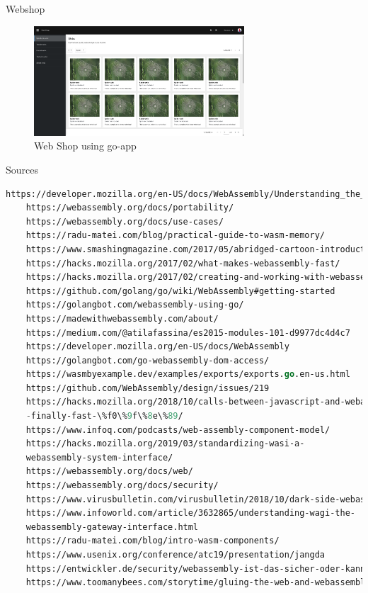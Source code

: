 \documentclass{beamer}
\begin{document}
\begin{frame}{Webshop}
    \begin{figure}
        \includegraphics[width=0.7\textwidth,height=0.7\textheight]{./images/webshop.png}
        \caption{Web Shop using go-app}
    \end{figure}
\end{frame}

\begin{frame}[fragile]{Sources}
    \begin{lstlisting}[language=Lisp,basicstyle=\tiny]
    https://developer.mozilla.org/en-US/docs/WebAssembly/Understanding_the_text_format
    https://webassembly.org/docs/portability/
    https://webassembly.org/docs/use-cases/
    https://radu-matei.com/blog/practical-guide-to-wasm-memory/
    https://www.smashingmagazine.com/2017/05/abridged-cartoon-introduction-webassembly/
    https://hacks.mozilla.org/2017/02/what-makes-webassembly-fast/
    https://hacks.mozilla.org/2017/02/creating-and-working-with-webassembly-modules/
    https://github.com/golang/go/wiki/WebAssembly#getting-started
    https://golangbot.com/webassembly-using-go/
    https://madewithwebassembly.com/about/
    https://medium.com/@atilafassina/es2015-modules-101-d9977dc4d4c7
    https://developer.mozilla.org/en-US/docs/WebAssembly
    https://golangbot.com/go-webassembly-dom-access/
    https://wasmbyexample.dev/examples/exports/exports.go.en-us.html
    https://github.com/WebAssembly/design/issues/219
    https://hacks.mozilla.org/2018/10/calls-between-javascript-and-webassembly-are
    -finally-fast-\%f0\%9f\%8e\%89/
    https://www.infoq.com/podcasts/web-assembly-component-model/
    https://hacks.mozilla.org/2019/03/standardizing-wasi-a-
    webassembly-system-interface/
    https://webassembly.org/docs/web/
    https://webassembly.org/docs/security/
    https://www.virusbulletin.com/virusbulletin/2018/10/dark-side-webassembly/
    https://www.infoworld.com/article/3632865/understanding-wagi-the-
    webassembly-gateway-interface.html
    https://radu-matei.com/blog/intro-wasm-components/
    https://www.usenix.org/conference/atc19/presentation/jangda
    https://entwickler.de/security/webassembly-ist-das-sicher-oder-kann-das-weg/
    https://www.toomanybees.com/storytime/gluing-the-web-and-webassembly-together
    \end{lstlisting}
\end{frame}
\end{document}
